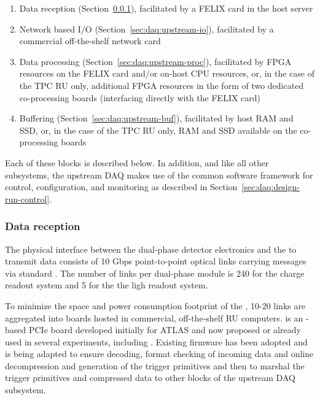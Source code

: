 \begin{enumerate}
\item Data reception (Section~\ref{sec:daq:upstream-receiver}), facilitated by a FELIX card in the host server
\item Network based I/O (Section~\ref{sec:daq:upstream-io}), facilitated by a commercial off-the-shelf network card
\item Data processing (Section~\ref{sec:daq:upstream-proc}), facilitated by FPGA resources on the FELIX
  card and/or on-host CPU resources, or, in the case of the TPC RU only,
  additional FPGA resources in the form of two dedicated co-processing
  boards (interfacing directly with the FELIX card)
\item Buffering (Section~\ref{sec:daq:upstream-buf}), facilitated by host RAM and SSD, or, in
  the case of the TPC RU only, RAM
  and SSD available on the co-processing boards
\end{enumerate}

Each of these blocks is described below. 
In addition, and like all other  subsystems, the upstream DAQ makes
use of the common software framework for control, configuration, and monitoring
as described in Section~\ref{sec:daq:design-run-control}.

\subsubsection{Data reception}
\label{sec:daq:upstream-receiver}
The physical interface between the dual-phase detector electronics and the  to
transmit data consists of 10 Gbps point-to-point optical links
carrying messages via standard .
The number of links per dual-phase   module is 240 for the charge readout system and 5 for the
the ligh readout system.

To minimize the space and power consumption footprint of the , 10-20
links are aggregated into  boards hosted in commercial,
off-the-shelf RU computers.
 is an -based PCIe board developed initially for ATLAS
and now proposed or already used in several experiments, including
. 
Existing firmware has been adopted and is being adapted to ensure
decoding, format checking of incoming data and online decompression and generation of the trigger primitives
and then to marshal the trigger primitives and compressed data to other blocks of
the upstream DAQ subsystem.

